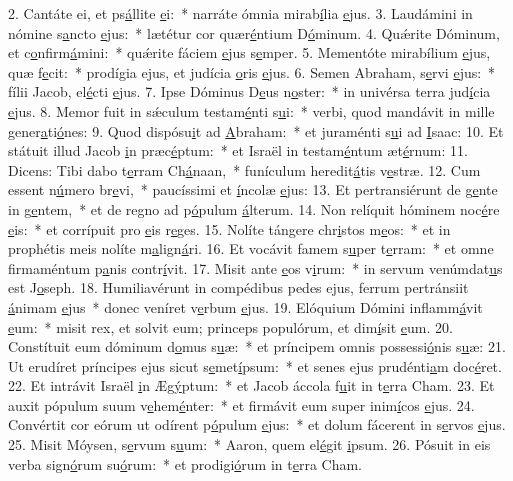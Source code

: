 2. Cantáte ei, et ps\uline{á}llite \uline{e}i:~* narráte ómnia mirab\uline{í}lia \uline{e}jus.
3. Laudámini in nómine s\uline{a}ncto \uline{e}jus:~* lætétur cor quær\uline{é}ntium D\uline{ó}minum.
4. Quǽrite Dóminum, et c\uline{o}nfirm\uline{á}mini:~* quǽrite fáciem \uline{e}jus s\uline{e}mper.
5. Mementóte mirabílium \uline{e}jus, quæ f\uline{e}cit:~* prodígia ejus, et judícia \uline{o}ris \uline{e}jus.
6. Semen Abraham, s\uline{e}rvi \uline{e}jus:~* fílii Jacob, el\uline{é}cti \uline{e}jus.
7. Ipse Dóminus D\uline{e}us n\uline{o}ster:~* in univérsa terra jud\uline{í}cia \uline{e}jus.
8. Memor fuit in sǽculum testam\uline{é}nti s\uline{u}i:~* verbi, quod mandávit in mille gener\uline{a}ti\uline{ó}nes:
9. Quod dispósu\uline{i}t ad \uline{A}braham:~* et juraménti s\uline{u}i ad \uline{I}saac:
10. Et státuit illud Jacob \uline{i}n præc\uline{é}ptum:~* et Israël in testam\uline{é}ntum æt\uline{é}rnum:
11. Dicens: Tibi dabo t\uline{e}rram Ch\uline{á}naan,~* funículum heredit\uline{á}tis v\uline{e}stræ.
12. Cum essent n\uline{ú}mero br\uline{e}vi,~* paucíssimi et \uline{í}ncolæ \uline{e}jus:
13. Et pertransiérunt de g\uline{e}nte in g\uline{e}ntem,~* et de regno ad p\uline{ó}pulum \uline{á}lterum.
14. Non relíquit hóminem noc\uline{é}re \uline{e}is:~* et corrípuit pro \uline{e}is r\uline{e}ges.
15. Nolíte tángere chr\uline{i}stos m\uline{e}os:~* et in prophétis meis nolíte m\uline{a}lign\uline{á}ri.
16. Et vocávit famem s\uline{u}per t\uline{e}rram:~* et omne firmaméntum p\uline{a}nis contr\uline{í}vit.
17. Misit ante \uline{e}os v\uline{i}rum:~* in servum venúmdat\uline{u}s est J\uline{o}seph.
18. Humiliavérunt in compédibus pedes ejus, ferrum pertránsiit \uline{á}nimam \uline{e}jus~* donec veníret v\uline{e}rbum \uline{e}jus.
19. Elóquium Dómini inflamm\uline{á}vit \uline{e}um:~* misit rex, et solvit eum; princeps populórum, et dim\uline{í}sit \uline{e}um.
20. Constítuit eum dóminum d\uline{o}mus s\uline{u}æ:~* et príncipem omnis possessi\uline{ó}nis s\uline{u}æ:
21. Ut erudíret príncipes ejus sicut s\uline{e}met\uline{í}psum:~* et senes ejus prudénti\uline{a}m doc\uline{é}ret.
22. Et intrávit Israël \uline{i}n Æg\uline{ý}ptum:~* et Jacob áccola f\uline{u}it in t\uline{e}rra Cham.
23. Et auxit pópulum suum v\uline{e}hem\uline{é}nter:~* et firmávit eum super inim\uline{í}cos \uline{e}jus.
24. Convértit cor eórum ut odírent p\uline{ó}pulum \uline{e}jus:~* et dolum fácerent in s\uline{e}rvos \uline{e}jus.
25. Misit Móysen, s\uline{e}rvum s\uline{u}um:~* Aaron, quem el\uline{é}git \uline{i}psum.
26. Pósuit in eis verba sign\uline{ó}rum su\uline{ó}rum:~* et prodigi\uline{ó}rum in t\uline{e}rra Cham.
